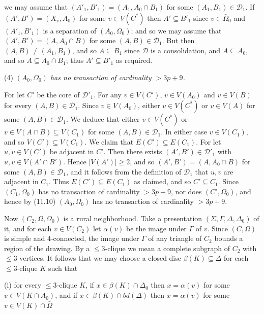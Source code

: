\noindent we may assume that $(A'_1, B'_1) = (A_1, A_0 \cap B_1)$ for some $(A_1, B_1) \in \mathcal{D}_1$. If $(A', B') = (X_v, A_0)$ for some $v \in V(C^*)$ then $A' \subseteq B'_1$ since $v \in \bar{\Omega}_0$ and $(A'_1, B'_1)$ is a separation of $(A_0, \Omega_0)$; and so we may assume that $(A', B') = (A, A_0 \cap B)$ for some $(A, B) \in \mathcal{D}_1$. But then $(A, B) \ne (A_1, B_1)$, and so $A \subseteq B_1$ since $\mathcal{D}$ is a consolidation, and $A \subseteq A_0$, and so $A \subseteq A_0 \cap B_1$; thus $A' \subseteq B'_1$ as required.

\hspace*{12pt}(4) \textit{$(A_0, \Omega_0)$ has no transaction of cardinality $> 3p + 9$.}

For let $C'$ be the core of $\mathcal{D}'_1$. For any $v \in V(C')$, $v \in V(A_0)$ and $v \in V(B)$ for every $(A, B) \in \mathcal{D}_1$. Since $v \in V(A_0)$, either $v \in V(C^*)$ or $v \in V(A)$ for some $(A, B) \in \mathcal{D}_1$. We deduce that either $v \in V(C^*)$ or $v \in V(A \cap B) \subseteq V(C_1)$ for some $(A, B) \in \mathcal{D}_1$. In either case $v \in V(C_1)$, and so $V(C') \subseteq V(C_1)$. We claim that $E(C') \subseteq E(C_1)$. For let $u, v \in V(C')$ be adjacent in $C'$. Then there exists $(A', B') \in \mathcal{D}'_1$ with $u, v \in V(A' \cap B')$. Hence $|V(A')| \ge 2$, and so $(A', B') = (A, A_0 \cap B)$ for some $(A, B) \in \mathcal{D}_1$, and it follows from the definition of $\mathcal{D}_1$ that $u, v$ are adjacent in $C_1$. Thus $E(C') \subseteq E(C_1)$ as claimed, and so $C' \subseteq C_1$. Since $(C_1, \Omega_0)$ has no transaction of cardinality $> 3p + 9$, nor does $(C', \Omega_0)$, and hence by (11.10) $(A_0, \Omega_0)$ has no transaction of cardinality $> 3p + 9$.

Now $(C_2, \Omega, \Omega_0)$ is a rural neighborhood. Take a presentation $(\Sigma, \Gamma, \Delta, \Delta_0)$ of it, and for each $v \in V(C_2)$ let $\alpha(v)$ be the image under $\Gamma$ of $v$. Since $(C, \Omega)$ is simple and 4-connected, the image under $\Gamma$ of any triangle of $C_2$ bounds a region of the drawing. By a $\le 3$-clique we mean a complete subgraph of $C_2$ with $\le 3$ vertices. It follows that we may choose a closed disc $\beta(K) \subseteq \Delta$ for each $\le 3$-clique $K$ such that

\hspace*{12pt}(i) for every $\le 3$-clique $K$, if $x \in \beta(K) \cap \Delta_0$ then $x = \alpha(v)$ for some $v \in V(K \cap A_0)$, and if $x \in \beta(K) \cap bd(\Delta)$ then $x = \alpha(v)$ for some $v \in V(K) \cap \bar{\Omega}$

